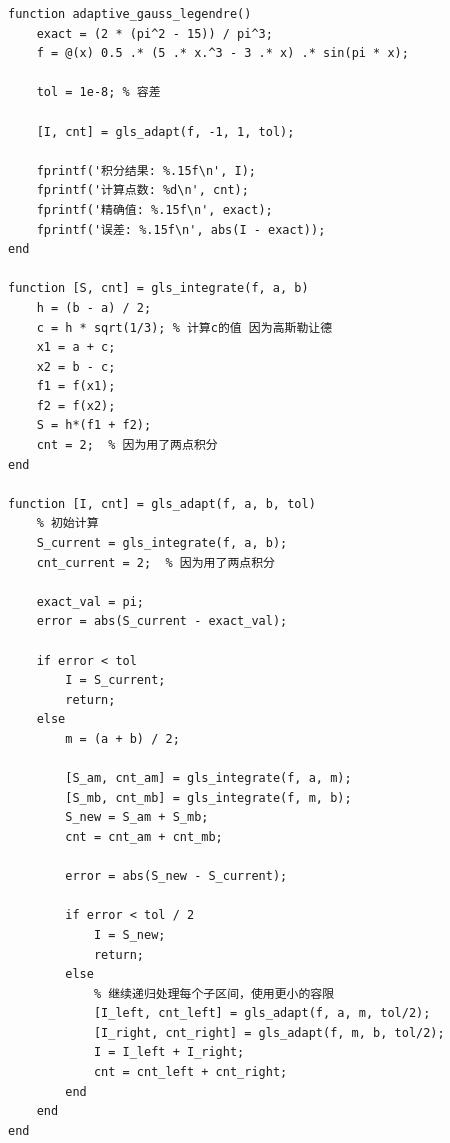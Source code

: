 \documentclass[UTF8,a4paper,11pt]{article}
\begin{document}
\begin{lstlisting}[style=matlab, caption={Gauss-Legendre}]
function adaptive_gauss_legendre()
    exact = (2 * (pi^2 - 15)) / pi^3;
    f = @(x) 0.5 .* (5 .* x.^3 - 3 .* x) .* sin(pi * x);
    
    tol = 1e-8; % 容差
    
    [I, cnt] = gls_adapt(f, -1, 1, tol);
    
    fprintf('积分结果: %.15f\n', I);
    fprintf('计算点数: %d\n', cnt);
    fprintf('精确值: %.15f\n', exact);
    fprintf('误差: %.15f\n', abs(I - exact));
end

function [S, cnt] = gls_integrate(f, a, b)
    h = (b - a) / 2;
    c = h * sqrt(1/3); % 计算c的值 因为高斯勒让德
    x1 = a + c;
    x2 = b - c;
    f1 = f(x1);
    f2 = f(x2);
    S = h*(f1 + f2);
    cnt = 2;  % 因为用了两点积分
end

function [I, cnt] = gls_adapt(f, a, b, tol)
    % 初始计算
    S_current = gls_integrate(f, a, b);
    cnt_current = 2;  % 因为用了两点积分
    
    exact_val = pi;
    error = abs(S_current - exact_val);
    
    if error < tol
        I = S_current;
        return;
    else
        m = (a + b) / 2;
        
        [S_am, cnt_am] = gls_integrate(f, a, m);
        [S_mb, cnt_mb] = gls_integrate(f, m, b);
        S_new = S_am + S_mb;
        cnt = cnt_am + cnt_mb;
        
        error = abs(S_new - S_current);
        
        if error < tol / 2
            I = S_new;
            return;
        else
            % 继续递归处理每个子区间，使用更小的容限
            [I_left, cnt_left] = gls_adapt(f, a, m, tol/2);
            [I_right, cnt_right] = gls_adapt(f, m, b, tol/2);
            I = I_left + I_right;
            cnt = cnt_left + cnt_right;
        end
    end
end
\end{lstlisting}
\end{document}
